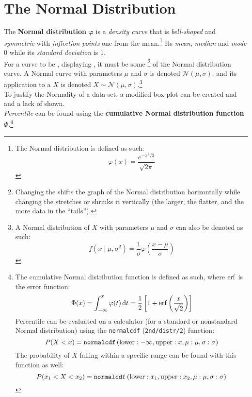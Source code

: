 \documentclass[../AP_Statistics.tex]{subfiles}
\begin{document}
		\section{The Normal Distribution}
			\begin{center}
			\end{center}
			The \textbf{Normal distribution} $\pmb{\varphi}$ is a \emph{density curve} that is \emph{bell-shaped} and \emph{symmetric} with \emph{inflection points} one  from the mean.\footnote{The Normal distribution is defined as such: \[\varphi(x) = \frac{e^{-x^2/2}}{\sqrt{2\pi}}\]} Its \emph{mean}, \emph{median} and \emph{mode} 0 while its \emph{standard deviation} is 1. \\
			For a curve to be , displaying , it must be some \footnote{Changing the  shifts the graph of the Normal distribution horizontally while changing the  stretches or shrinks it vertically (the larger, the flatter, and the more data in the \enquote{tails}).} of the Normal distribution curve. A Normal curve with parameters $\mu$ and $\sigma$ is denoted $\mathcal{N}(\mu, \sigma)$, and its application to a  $X$ is denoted $X\sim\mathcal{N}(\mu,\sigma)$.\footnote{A Normal distribution of $X$ with parameters $\mu$ and $\sigma$ can also be denoted as such:\[f(x\mid\mu,\sigma^2) = \frac{1}{\sigma}\varphi\left(\frac{x - \mu}{\sigma}\right)\]} \\
			To justify the Normality of a data set, a modified box plot can be created and  and a lack of  shown. \\
			\emph{Percentile} can be found using the \textbf{cumulative Normal distribution function} $\Phi$.\footnote{The cumulative Normal distribution function is defined as such, where $\operatorname{erf}$ is the error function:\[\Phi(x) = \int_{-\infty}^x\varphi(t)\,\mathrm{d} t = \frac{1}{2}\left[1 + \operatorname{erf}\left(\frac{x}{\sqrt{2}}\right)\right]\]Percentile can be evaluated on a calculator (for a standard or nonstandard Normal distribution) using the \texttt{normalcdf} (\texttt{2nd/distr/2}) function:\[P(X < x) = \operatorname{\texttt{normalcdf}}\left(\mathrm{lower}: -\infty, \mathrm{upper}: x, \mu: \mu, \sigma: \sigma\right)\]The probability of $X$ falling within a specific range can be found with this function as well:\[P(x_1 < X < x_2) = \operatorname{\texttt{normalcdf}}\left(\mathrm{lower}: x_1, \mathrm{upper}: x_2, \mu: \mu, \sigma: \sigma\right)\]}
\end{document}

